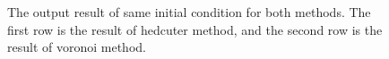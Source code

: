 \documentclass[11pt]{article}
\begin{document}
\begin{figure}[hbt]
{    \label{fig:sameInput5}
  }\hspace{-3mm}
    \caption{The output result of same initial condition for both methods. The first row is the result of hedcuter method, and the second row is the result of voronoi method. \label{fig:sameInput}}
\end{figure}
\end{document}
